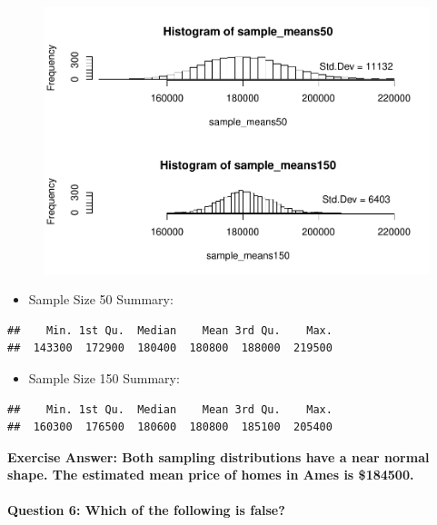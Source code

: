 \documentclass[]{article}
\begin{document}
\begin{figure}[htbp]
\centering
\includegraphics{Lab3A_files/figure-latex/CreateSampleMeans150DistPrice-2.pdf}
\caption{}
\end{figure}

\begin{itemize}
\itemsep1pt\parskip0pt
\item
  Sample Size 50 Summary:
\end{itemize}

\begin{verbatim}
##    Min. 1st Qu.  Median    Mean 3rd Qu.    Max. 
##  143300  172900  180400  180800  188000  219500
\end{verbatim}

\begin{itemize}
\itemsep1pt\parskip0pt
\item
  Sample Size 150 Summary:
\end{itemize}

\begin{verbatim}
##    Min. 1st Qu.  Median    Mean 3rd Qu.    Max. 
##  160300  176500  180600  180800  185100  205400
\end{verbatim}

\textbf{Exercise Answer: Both sampling distributions have a near normal
shape. The estimated mean price of homes in Ames is \$184500.}

\paragraph{Question 6: Which of the following is
false?}\label{question-6-which-of-the-following-is-false}
\end{document}
